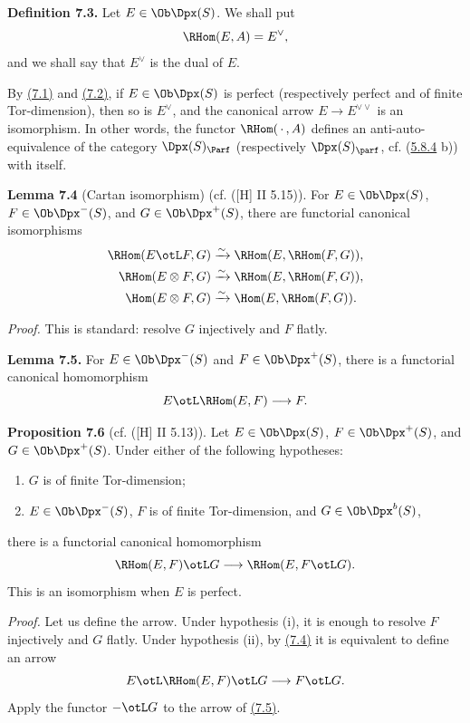 \textbf{Definition 7.3.} Let \(E\in\Ob\Dpx(S)\). We shall put
\[
  \RHom(E,A)=E^\vee,
\]
and we shall say that \(E^\vee\) is the dual of \(E\).

By \hyperlink{sga6.e01.prop.7-1}{(7.1)} and \hyperlink{sga6.e01.prop.7-2}{(7.2)}, if \(E\in\Ob\Dpx(S)\) is perfect (respectively perfect and of finite Tor-dimension), then so is \(E^\vee\), and the canonical arrow \(E\to E^{\vee\vee}\) is an isomorphism. In other words, the functor \(\RHom(\,\cdot\,,A)\) defines an anti-auto-equivalence of the category \(\Dpx(S)_{\Parf}\) (respectively \(\Dpx(S)_{\parf}\), cf. (\hyperlink{sga6.e01.rem.5-8-4}{5.8.4} b)) with itself.

\textbf{Lemma 7.4} (Cartan isomorphism) (cf. ([H] II 5.15)). For \(E\in\Ob\Dpx(S)\), \(F\in\Ob\Dpx^-(S)\), and \(G\in\Ob\Dpx^+(S)\), there are functorial canonical isomorphisms
\[
\begin{aligned}
\RHom(E\otL F,G)&\xrightarrow{\sim}\RHom(E,\RHom(F,G)),\\
\RHom(E\otimes F,G)&\xrightarrow{\sim}\RHom(E,\RHom(F,G)),\\
\Hom(E\otimes F,G)&\xrightarrow{\sim}\Hom(E,\RHom(F,G)).
\end{aligned}
\]

\emph{Proof.} This is standard: resolve \(G\) injectively and \(F\) flatly.

\textbf{Lemma 7.5.} For \(E\in\Ob\Dpx^-(S)\) and \(F\in\Ob\Dpx^+(S)\), there is a functorial canonical homomorphism
\[
  E\otL \RHom(E,F)\longrightarrow F.
\]

\textbf{Proposition 7.6} (cf. ([H] II 5.13)). Let \(E\in\Ob\Dpx(S)\), \(F\in\Ob\Dpx^+(S)\), and \(G\in\Ob\Dpx^+(S)\). Under either of the following hypotheses:
\begin{enumerate}[label=(\roman*)]
\item \(G\) is of finite Tor-dimension;
\item \(E\in\Ob\Dpx^-(S)\), \(F\) is of finite Tor-dimension, and \(G\in\Ob\Dpx^b(S)\),
\end{enumerate}
there is a functorial canonical homomorphism
\[
  \RHom(E,F)\otL G
  \longrightarrow
  \RHom(E,F\otL G).
\]
This is an isomorphism when \(E\) is perfect.

\emph{Proof.} Let us define the arrow. Under hypothesis (i), it is enough to resolve \(F\) injectively and \(G\) flatly. Under hypothesis (ii), by \hyperlink{sga6.e01.lem.7-4}{(7.4)} it is equivalent to define an arrow
\[
  E\otL\RHom(E,F)\otL G\longrightarrow F\otL G.
\]
Apply the functor \(-\otL G\) to the arrow of \hyperlink{sga6.e01.lem.7-5}{(7.5)}.

